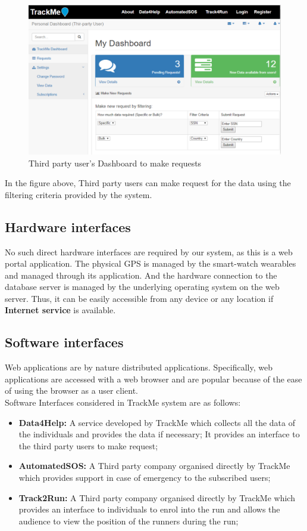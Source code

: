 \documentclass[12pt]{report}
\begin{document}
\begin{figure}[H]
\centering
\includegraphics[scale=0.35]{../Assets/Make_Request.png}\caption[UI: Third party user's Dashboard to make requests]{Third party user's Dashboard to make requests}
\label{fig:Make_Request}
\end{figure}

In the figure above, Third party users can make request for the data using the filtering criteria provided by the system.

\subsection{Hardware interfaces}
No such direct hardware interfaces are required by our system, as this is a web portal application. The physical GPS is managed by the smart-watch wearables and managed through its application. And the hardware connection to the database server is managed by the underlying operating system on the web server. Thus, it can be easily accessible from any device or any location if \textbf{Internet service} is available.

\subsection{Software interfaces}
Web applications are by nature distributed applications. Specifically, web applications are accessed with a web browser and are popular because of the ease of using the browser as a user client.\\
Software Interfaces considered in TrackMe system are as follows:
\begin{itemize}
\item{} \textbf{Data4Help:} A service developed by TrackMe which collects all the data of the individuals and provides the data if necessary; It provides an interface to the third party users to make request;
\item{} \textbf{AutomatedSOS:} A Third party company organised directly by TrackMe which provides support in case of emergency to the subscribed users;
\item{} \textbf{Track2Run:} A Third party company organised directly by TrackMe which provides an interface to individuals to enrol into the run and allows the audience to view the position of the runners during the run;
\end{itemize}
\end{document}
